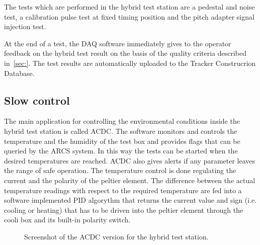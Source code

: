 The tests which are performed in the hybrid test station are a pedestal and noise test, a calibration pulse test at fixed timing position and the pitch adapter signal injection test.

At the end of a test, the DAQ software immediately gives to the operator feedback on the hybrid test result on the basis of the quality criteria described in~\ref{sec:}. The test results are automatically uploaded to the Tracker Construcrion Database.

\subsection{Slow control}

The main application for controlling the environmental conditions inside the hybrid test station is called ACDC. 
The software monitors and controls the temperature and the humidity of the test box and provides flags that can be queried by the ARCS system.
In this way the tests can be started when the desired temperatures are reached.
ACDC also gives alerts if any parameter leaves the range of safe operation. 
The temperature control is done regulating the current and the polarity of the peltier element. 
The difference between the actual temperature readings with respect to the required temperature are fed into a software implemented PID algorythm that returns the current value and sign (i.e. cooling or heating) that has to be driven into the peltier element through the cooli box and its built-in polarity switch.
\begin{figure}[h]
  \begin{center}
    \caption{Screenshot of the ACDC version for the hybrid test station.}
    \label{fig:ss_acdc_teststation}
  \end{center}
\end{figure}

